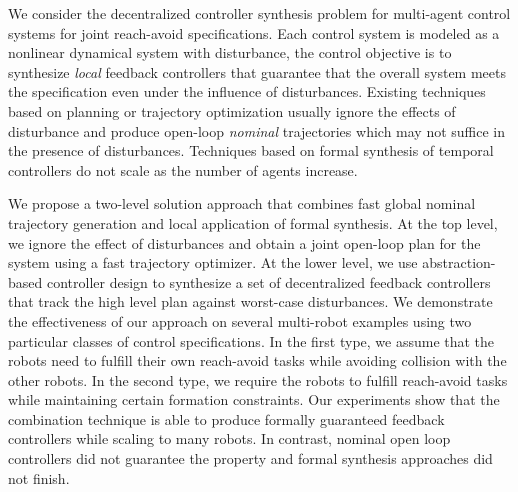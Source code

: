 
We consider the decentralized controller synthesis problem for multi-agent control systems for joint reach-avoid specifications.
Each control system is modeled as a nonlinear dynamical system with disturbance, the control objective is to synthesize \emph{local}
feedback controllers that guarantee that the overall system meets the specification even under the influence of disturbances.
%
Existing techniques based on planning or trajectory optimization usually ignore the effects of disturbance and produce open-loop
\emph{nominal} trajectories which may not suffice in the presence of disturbances.
Techniques based on formal synthesis of temporal controllers do not scale as the number of agents increase.

We propose a two-level solution approach that combines fast global nominal trajectory generation and local application of formal synthesis.
At the top level, we ignore the effect of disturbances and obtain a joint open-loop plan for the system using a fast trajectory optimizer.
At the lower level, we use abstraction-based controller design to synthesize a set of decentralized feedback controllers 
that track the high level plan against worst-case disturbances.
We demonstrate the effectiveness of our approach on several multi-robot examples using two particular classes of control specifications.
In the first type, we assume that the robots need to fulfill their own reach-avoid tasks while avoiding collision with the other robots.
In the second type, we require the robots to fulfill reach-avoid tasks while maintaining certain formation constraints.
Our experiments show that the combination technique is able to produce formally guaranteed feedback controllers while scaling to many robots.
In contrast, nominal open loop controllers did not guarantee the property and formal synthesis approaches did not finish.
